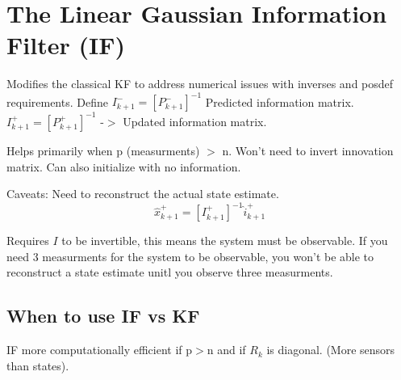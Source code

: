 \documentclass{article}
\begin{document}
  \section{The Linear Gaussian Information Filter (IF)}
    Modifies the classical KF to address numerical issues with inverses and posdef requirements.
    Define \( I^{-}_{k+1} = [P^{-}_{k+1}]^{-1}\) Predicted information matrix. \newline
       \( I^{+}_{k+1} = [P^{+}_{k+1}]^{-1}\) -$>$ Updated information matrix.

       Helps primarily when p (measurments) $>$ n. Won't need to invert innovation matrix.
       Can also initialize with no information.

       Caveats: Need to reconstruct the actual state estimate. 
       \[
          \hat{x}^+_{k+1} = [I^+_{k+1}]^{-1} \hat{i}^+_{k+1}
       \]

       Requires $I$ to be invertible, this means the system must be observable. If you need 3
       measurments for the system to be observable, you won't be able to reconstruct a state estimate
       unitl you observe three measurments.

       \subsection{When to use IF vs KF}

      IF more computationally efficient if p$>$n and if $R_k$ is diagonal. (More sensors than states).
      



    
\end{document}
